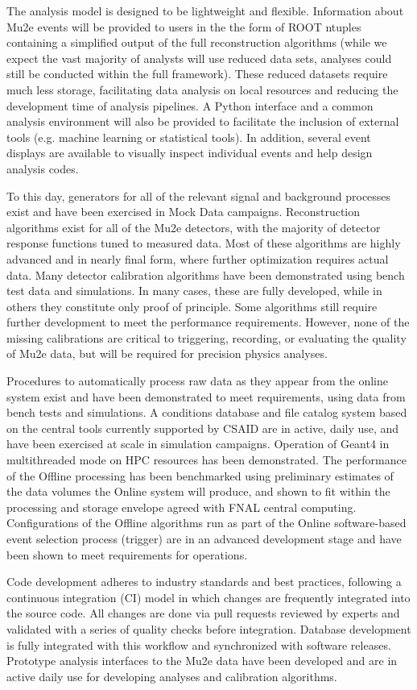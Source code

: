 The analysis model is designed to be lightweight and flexible. Information about Mu2e events will be provided to users in the the form of ROOT ntuples containing a simplified output of the full reconstruction algorithms (while we expect the vast majority of analysts will use reduced data sets, analyses could still be conducted within the full framework). These reduced datasets require much less storage, facilitating data analysis on local resources and reducing the development time of analysis pipelines. A Python interface and a common analysis environment will also be provided to facilitate the inclusion of external tools (e.g. machine learning or statistical tools). In addition, several event displays are available to visually inspect individual events and help design analysis codes.

To this day, generators for all of the relevant signal and background processes exist and have been exercised in Mock Data campaigns. Reconstruction algorithms exist for all of the Mu2e detectors, with the majority of detector response functions tuned to measured data. Most of these algorithms are highly advanced and in nearly final form, where further optimization requires actual data. Many detector calibration algorithms have been demonstrated using bench test data and simulations. In many cases, these are fully developed, while in others they constitute only proof of principle. Some algorithms still require further development to meet the performance requirements. However, none of the missing calibrations are critical to triggering, recording, or evaluating the quality of Mu2e data, but will be required for precision physics analyses. 

Procedures to automatically process raw data as they appear from the online system exist and have been demonstrated to meet requirements, using data from bench tests and simulations. A conditions database and file catalog system based on the central tools currently supported by CSAID are in active, daily use, and have been exercised at scale in simulation campaigns. Operation of Geant4 in multithreaded mode on HPC resources has been demonstrated. The performance of the Offline processing has been benchmarked using preliminary estimates of the data volumes the Online system will produce, and shown to fit within the processing and storage envelope agreed with FNAL central computing. Configurations of the Offline algorithms run as part of the Online software-based event selection process (trigger) are in an advanced development stage and have been shown to meet requirements for \runone operations.

Code development adheres to industry standards and best practices, following a continuous integration (CI) model in which changes are frequently integrated into the source code. All changes are done via pull requests reviewed by experts and validated with a series of quality checks before integration. Database development is fully integrated with this workflow and synchronized with software releases. Prototype analysis interfaces to the Mu2e data have been developed and are in active daily use for developing analyses and calibration algorithms.